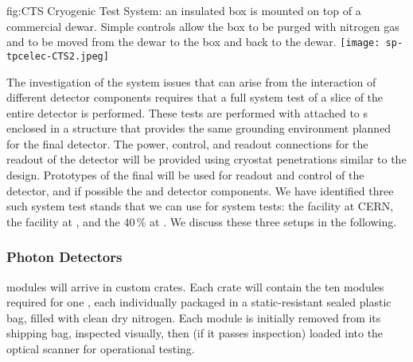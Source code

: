 \begin{dunefigure}
{fig:CTS}
{Cryogenic Test System: an insulated box is mounted on top of a commercial \lntwo dewar.  Simple controls allow the box to be purged with nitrogen gas and \lntwo to be moved from the dewar to the box and back to the dewar.}
\texttt{[image: sp-tpcelec-CTS2.jpeg]}
\end{dunefigure}



The investigation of the system issues that can arise from the interaction 
of different detector components requires that a full system test of a slice
of the entire detector is performed. These tests are performed with 
attached to s enclosed in a structure that provides the same
grounding environment planned for the final  detector. The
power, control, and readout connections for the readout of the detector
will be provided using cryostat penetrations similar to the 
design. Prototypes of the final  will be used for readout and
control of the detector, and if possible the  and 
detector components. We have identified three such system test stands
that we can use for system tests: the  facility at CERN, the
 facility at , and the \num{40}\,\%  at .
We discuss these three setups in the following.


\subsubsection{Photon Detectors}

 modules will arrive %
in custom crates.  Each crate will contain the ten modules required for one , each individually packaged in a static-resistant sealed plastic bag, filled with clean dry nitrogen. Each  module is initially removed from its shipping bag, inspected visually, then (if it passes inspection) loaded into the optical scanner for operational testing.


